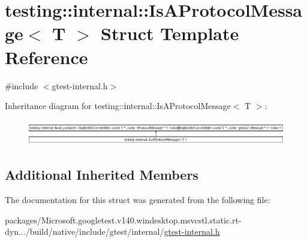 \hypertarget{structtesting_1_1internal_1_1_is_a_protocol_message}{}\section{testing\+::internal\+::Is\+A\+Protocol\+Message$<$ T $>$ Struct Template Reference}
\label{structtesting_1_1internal_1_1_is_a_protocol_message}


{\ttfamily \#include $<$gtest-\/internal.\+h$>$}

Inheritance diagram for testing\+::internal\+::Is\+A\+Protocol\+Message$<$ T $>$\+:\begin{figure}[H]
\begin{center}
\leavevmode
\includegraphics[height=1.132457cm]{structtesting_1_1internal_1_1_is_a_protocol_message}
\end{center}
\end{figure}
\subsection*{Additional Inherited Members}


The documentation for this struct was generated from the following file\+:\begin{DoxyCompactItemize}
\item 
packages/\+Microsoft.\+googletest.\+v140.\+windesktop.\+msvcstl.\+static.\+rt-\/dyn.../build/native/include/gtest/internal/\mbox{\hyperlink{gtest-internal_8h}{gtest-\/internal.\+h}}\end{DoxyCompactItemize}
